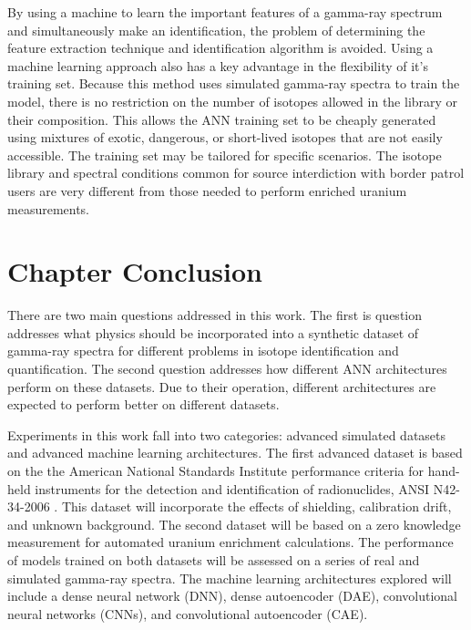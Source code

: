 By using a machine to learn the important features of a gamma-ray spectrum and simultaneously make an identification, the problem of determining the feature extraction technique and identification algorithm is avoided. Using a machine learning approach also has a key advantage in the flexibility of it's training set. Because this method uses simulated gamma-ray spectra to train the model, there is no restriction on the number of isotopes allowed in the library or their composition. This allows the ANN training set to be cheaply generated using mixtures of exotic, dangerous, or short-lived isotopes that are not easily accessible. The training set may be tailored for specific scenarios. The isotope library and spectral conditions common for source interdiction with border patrol users are very different from those needed to perform enriched uranium measurements. %

\section{Chapter Conclusion}

There are two main questions addressed in this work. The first is question addresses what physics should be incorporated into a synthetic dataset of gamma-ray spectra for different problems in isotope identification and quantification. The second question addresses how different ANN architectures perform on these datasets. Due to their operation, different architectures are expected to perform better on different datasets. %

Experiments in this work fall into two categories: advanced simulated datasets and advanced machine learning architectures. The first advanced dataset is based on the the American National Standards Institute performance criteria for hand-held instruments for the detection and identification of radionuclides, ANSI N42-34-2006 \cite{ANSI}. This dataset will incorporate the effects of shielding, calibration drift, and unknown background. The second dataset will be based on a zero knowledge measurement for automated uranium enrichment calculations. The performance of models trained on both datasets will be assessed on a series of real and simulated gamma-ray spectra. The machine learning architectures explored will include a dense neural network (DNN), dense autoencoder (DAE), convolutional neural networks (CNNs), and convolutional autoencoder (CAE).